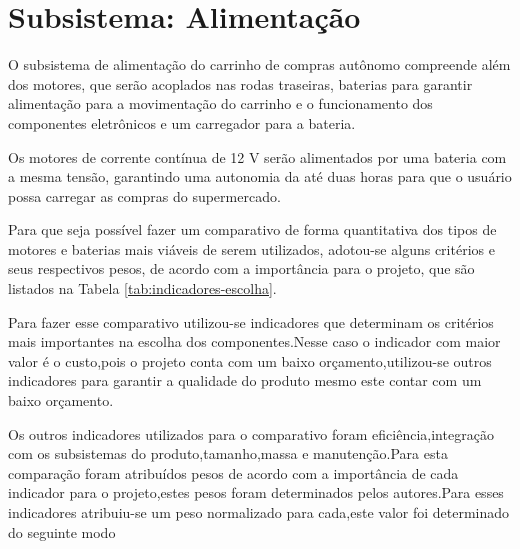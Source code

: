 \section{Subsistema: Alimentação}

\par O subsistema de alimentação do carrinho de compras autônomo compreende além dos  motores, que serão acoplados nas rodas traseiras, baterias para garantir alimentação para a movimentação do carrinho e o funcionamento dos componentes eletrônicos e um carregador para a bateria.
\par Os motores de corrente contínua de 12 V serão alimentados por uma bateria com a mesma tensão, garantindo uma autonomia da até duas horas para que o usuário possa carregar as  compras do supermercado.
\par Para que seja possível fazer um comparativo de forma quantitativa dos tipos de motores e baterias mais viáveis de serem utilizados, adotou-se alguns critérios e seus respectivos pesos, de acordo com a importância para o projeto, que são listados na Tabela \ref{tab:indicadores-escolha}.
\par Para fazer esse comparativo utilizou-se indicadores que determinam os critérios mais importantes na escolha dos componentes.Nesse caso o indicador com maior valor é o custo,pois o projeto conta com um baixo orçamento,utilizou-se outros indicadores para garantir a qualidade do produto mesmo este contar com um baixo orçamento.
\par Os outros indicadores utilizados para o comparativo foram eficiência,integração com os subsistemas do produto,tamanho,massa e manutenção.Para esta comparação foram atribuídos pesos de acordo com a importância de cada indicador para o projeto,estes pesos foram determinados pelos autores.Para esses indicadores atribuiu-se um peso normalizado para cada,este valor foi determinado do seguinte modo 

